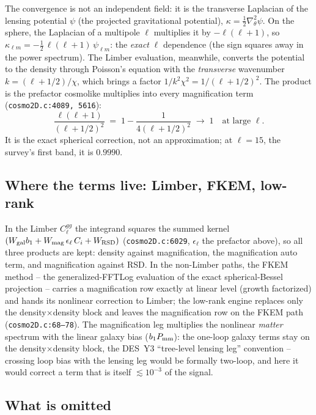 \documentclass[11pt]{article}
\begin{document}
The convergence is not an independent field: it is the transverse
Laplacian of the lensing potential $\psi$ (the projected
gravitational potential), $\kappa = \tfrac12 \nabla^2_\theta \psi$.
On the sphere, the Laplacian of a multipole $\ell$ multiplies it by
$-\ell(\ell+1)$, so $\kappa_{\ell m} = -\tfrac12\,
\ell(\ell+1)\,\psi_{\ell m}$: the \emph{exact} $\ell$ dependence (the
sign squares away in the power spectrum).
The Limber evaluation, meanwhile, converts the potential to the
density through Poisson's equation with the \emph{transverse}
wavenumber $k = (\ell + 1/2)/\chi$, which brings a factor
$1/k^2\chi^2 = 1/(\ell+1/2)^2$.  The product is the prefactor
cosmolike multiplies into every magnification term
(\texttt{cosmo2D.c:4089, 5616}):
\begin{equation}
  \frac{\ell(\ell+1)}{(\ell + 1/2)^2}
  \;=\; 1 - \frac{1}{4(\ell+1/2)^2}\;\to\;1
  \quad\text{at large } \ell .
\end{equation}
It is the exact spherical correction, not an approximation; at
$\ell = 15$, the survey's first band, it is $0.9990$.

\subsection{Where the terms live: Limber, FKEM, low-rank}

In the Limber $C_\ell^{gg}$ the integrand squares the summed kernel
$(W_{\rm gal} b_1 + W_{\rm mag}\,\epsilon_\ell\, C_i + W_{\rm RSD})$
(\texttt{cosmo2D.c:6029}, $\epsilon_\ell$ the prefactor above), so
all three products are kept: density against magnification, the
magnification auto term, and magnification against RSD.  In the non-Limber
paths, the FKEM method -- the generalized-FFTLog evaluation of the
exact spherical-Bessel projection \cite{Fang2020} -- carries a
magnification row exactly at linear level (growth factorized) and
hands its nonlinear correction to Limber; the low-rank engine
replaces only the density$\times$density block and leaves the
magnification row on the FKEM path (\texttt{cosmo2D.c:68--78}).  The
magnification leg multiplies the nonlinear \emph{matter} spectrum
with the linear galaxy bias ($b_1 P_{\rm mm}$): the one-loop galaxy
terms stay on the density$\times$density block, the DES~Y3
``tree-level lensing leg'' convention \cite{KrauseY3} -- crossing
loop bias with the lensing leg would be formally two-loop, and here
it would correct a term that is itself $\lesssim 10^{-3}$ of the
signal.

\subsection{What is omitted}
\label{sec:omitted}
\end{document}
